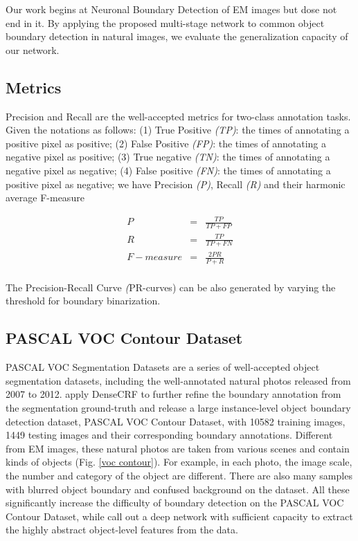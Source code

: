 \documentclass[senior]{IPSstyle}
\begin{document}
Our work begins at Neuronal Boundary Detection of EM images but dose not end in it. By applying the proposed multi-stage network to common object boundary detection in natural images, we evaluate the generalization capacity of our network.

\subsection{Metrics}
Precision and Recall are the well-accepted metrics for two-class annotation tasks\cite{Shen2016CVPR, Shen2017TIP, Yang2016}. Given the notations as follows: 
(1) True Positive \emph{(TP)}: the times of annotating a positive pixel as positive;
(2) False Positive \emph{(FP)}: the times of annotating a negative pixel as positive;
(3) True negative \emph{(TN)}: the times of annotating a negative pixel as negative;
(4) False positive \emph{(FN)}: the times of annotating a positive pixel as negative;
we have Precision \emph{(P)}, Recall \emph{(R)} and their harmonic average F-measure

\begin{eqnarray}
P &=& \frac{TP}{TP+FP} \\
R &=& \frac{TP}{TP+FN} \\
F-measure &=& \frac{2PR}{P+R} \\
\end{eqnarray}

The Precision-Recall Curve \emph(PR-curves) can be also generated by varying the threshold for boundary binarization\cite{Shen2016CVPR}.

\subsection{PASCAL VOC Contour Dataset}
PASCAL VOC Segmentation Datasets are a series of well-accepted object segmentation datasets,  including the well-annotated natural photos released from 2007 to 2012. \cite{Yang2016} apply DenseCRF\cite{Krahenbuhl2011} to further refine the boundary annotation from the segmentation ground-truth and release a large instance-level object boundary detection dataset, PASCAL VOC Contour Dataset, with 10582 training images, 1449 testing images and their corresponding boundary annotations. Different from EM images, these natural photos are taken from various scenes and contain kinds of objects (Fig. \ref{voc contour}). For example, in each photo, the image scale, the number and category of the object are different. There are also many samples with blurred object boundary and confused background on the dataset. All these significantly increase the difficulty of boundary detection on the PASCAL VOC Contour Dataset, while call out a deep network with sufficient capacity to extract the highly abstract object-level features from the data.
\end{document}
